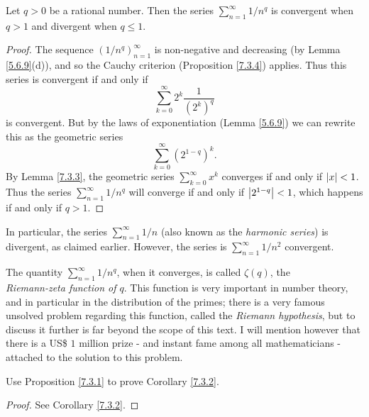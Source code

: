 \begin{corollary}\label{7.3.7}
Let \(q > 0\) be a rational number.
Then the series \(\sum_{n = 1}^\infty 1 / n^q\) is convergent when \(q > 1\) and divergent when \(q \leq 1\).
\end{corollary}

\begin{proof}
The sequence \((1 / n^q)_{n = 1}^\infty\) is non-negative and decreasing (by Lemma \ref{5.6.9}(d)), and so the Cauchy criterion (Proposition \ref{7.3.4}) applies.
Thus this series is convergent if and only if
\[
    \sum_{k = 0}^\infty 2^k \frac{1}{(2^k)^q}
\]
is convergent.
But by the laws of exponentiation (Lemma \ref{5.6.9}) we can rewrite this as the geometric series
\[
    \sum_{k = 0}^\infty (2^{1 - q})^k.
\]
By Lemma \ref{7.3.3}, the geometric series \(\sum_{k = 0}^\infty x^k\) converges if and only if \(\abs*{x} < 1\).
Thus the series \(\sum_{n = 1}^\infty 1 / n^q\) will converge if and only if \(\abs*{2^{1 - q}} < 1\), which happens if and only if \(q > 1\).
\end{proof}

\begin{note}
In particular, the series \(\sum_{n = 1}^\infty 1 / n\) (also known as the \emph{harmonic series}) is divergent, as claimed earlier.
However, the series is \(\sum_{n = 1}^\infty 1 / n^2\) convergent.
\end{note}

\begin{remark}\label{7.3.8}
The quantity \(\sum_{n = 1}^\infty 1 / n^q\), when it converges, is called \(\zeta(q)\), the \\
\emph{Riemann-zeta function of \(q\)}.
This function is very important in number theory, and in particular in the distribution of the primes;
there is a very famous unsolved problem regarding this function, called the \emph{Riemann hypothesis}, but to discuss it further is far beyond the scope of this text.
I will mention however that there is a US\$ \(1\) million prize
- and instant fame among all mathematicians -
attached to the solution to this problem.
\end{remark}

\exercisesection

\begin{exercise}\label{ex 7.3.1}
Use Proposition \ref{7.3.1} to prove Corollary \ref{7.3.2}.
\end{exercise}

\begin{proof}
See Corollary \ref{7.3.2}.
\end{proof}

